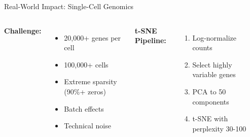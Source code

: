 \begin{frame}{Real-World Impact: Single-Cell Genomics}
\begin{columns}
\textbf{Challenge:}
\begin{itemize}
\item 20,000+ genes per cell
\item 100,000+ cells
\item Extreme sparsity (90\%+ zeros)
\item Batch effects
\item Technical noise
\end{itemize}

\textbf{t-SNE Pipeline:}
\begin{enumerate}
\item Log-normalize counts
\item Select highly variable genes
\item PCA to 50 components
\item t-SNE with perplexity 30-100
\end{enumerate}

\begin{center}
\end{center}
\end{columns}

\end{frame}

